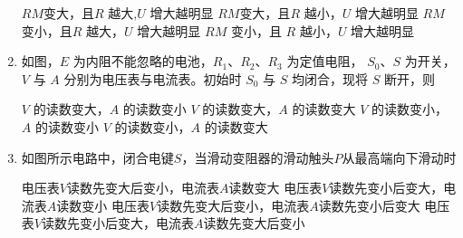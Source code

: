 \begin{enumerate}
\fourchoices
{$ RM $变大，且$ R $ 越大,$ U $ 增大越明显}
{$ RM $变大，且$ R $ 越小，$ U $ 增大越明显}
{$ RM $变小，且$ R $ 越大，$ U $ 增大越明显}
{$ RM $ 变小，且 $ R $ 越小，$ U $ 增大越明显}


\item 
{}
如图，$ E $ 为内阻不能忽略的电池，$ R_{1} $、$ R_{2} $、$ R_{3} $ 为定值电阻，
$ S_{0} $、$ S $ 为开关，$ V $ 与 $ A $ 分别为电压表与电流表。初始时 $ S_{0} $ 与 $ S $
均闭合，现将 $ S $ 断开，则  
\begin{figure}[h!]
\centering

\end{figure}





\fourchoices
{$ V $ 的读数变大，$ A $ 的读数变小}
{$ V $ 的读数变大，$ A $ 的读数变大}
{$ V $ 的读数变小，$ A $ 的读数变小}
{$ V $ 的读数变小，$ A $ 的读数变大}



\item 
{}
如图所示电路中，闭合电键$ S $，当滑动变阻器的滑动触头$ P $从最高端向下滑动时  
\begin{figure}[h!]
\centering

\end{figure}

\fourchoices
{电压表$ V $读数先变大后变小，电流表$ A $读数变大}
{电压表$ V $读数先变小后变大，电流表$ A $读数变小}
{电压表$ V $读数先变大后变小，电流表$ A $读数先变小后变大}
{电压表$ V $读数先变小后变大，电流表$ A $读数先变大后变小}








\end{enumerate}

